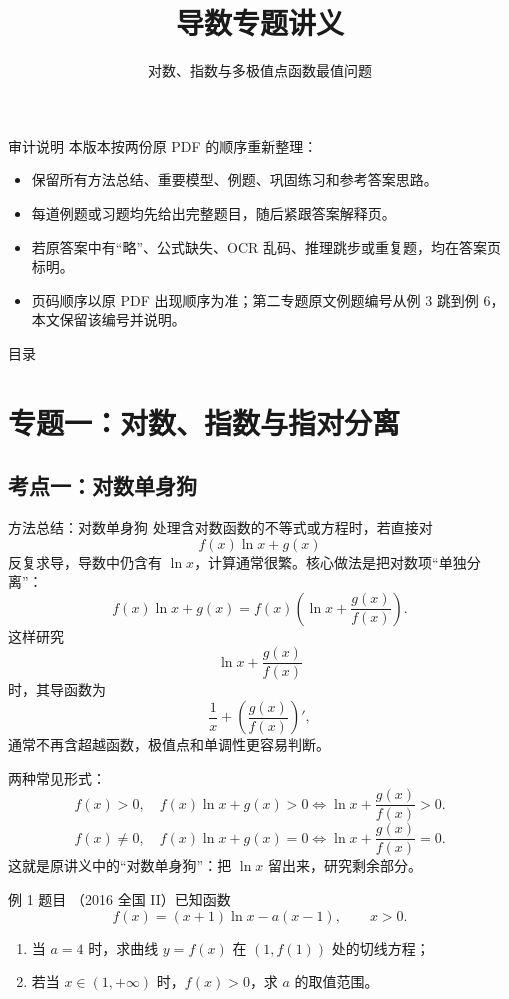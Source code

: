 ﻿\documentclass[aspectratio=169,10pt]{ctexbeamer}
\title{导数专题讲义}
\subtitle{对数、指数与多极值点函数最值问题}
\author{}
\date{}
\begin{document}
\begin{frame}
  \titlepage
\end{frame}

\begin{frame}{审计说明}
\small
本版本按两份原 PDF 的顺序重新整理：
\begin{itemize}
  \item 保留所有方法总结、重要模型、例题、巩固练习和参考答案思路。
  \item 每道例题或习题均先给出完整题目，随后紧跟答案解释页。
  \item 若原答案中有“略”、公式缺失、OCR 乱码、推理跳步或重复题，均在答案页标明。
  \item 页码顺序以原 PDF 出现顺序为准；第二专题原文例题编号从例 3 跳到例 6，本文保留该编号并说明。
\end{itemize}
\end{frame}

\begin{frame}{目录}
\tableofcontents
\end{frame}

\section{专题一：对数、指数与指对分离}

\subsection{考点一：对数单身狗}

\begin{frame}[allowframebreaks]{方法总结：对数单身狗}
\small
处理含对数函数的不等式或方程时，若直接对
\[
f(x)\ln x+g(x)
\]
反复求导，导数中仍含有 $\ln x$，计算通常很繁。核心做法是把对数项“单独分离”：
\[
f(x)\ln x+g(x)=f(x)\left(\ln x+\frac{g(x)}{f(x)}\right).
\]
这样研究
\[
\ln x+\frac{g(x)}{f(x)}
\]
时，其导函数为
\[
\frac1x+\left(\frac{g(x)}{f(x)}\right)',
\]
通常不再含超越函数，极值点和单调性更容易判断。

\framebreak

两种常见形式：
\[
f(x)>0,\quad f(x)\ln x+g(x)>0
\Longleftrightarrow
\ln x+\frac{g(x)}{f(x)}>0.
\]
\[
f(x)\ne0,\quad f(x)\ln x+g(x)=0
\Longleftrightarrow
\ln x+\frac{g(x)}{f(x)}=0.
\]
这就是原讲义中的“对数单身狗”：把 $\ln x$ 留出来，研究剩余部分。
\end{frame}

\begin{frame}{例 1 题目}
\small
（2016 全国 II）已知函数
\[
f(x)=(x+1)\ln x-a(x-1),\qquad x>0.
\]
\begin{enumerate}
  \item 当 $a=4$ 时，求曲线 $y=f(x)$ 在 $(1,f(1))$ 处的切线方程；
  \item 若当 $x\in(1,+\infty)$ 时，$f(x)>0$，求 $a$ 的取值范围。
\end{enumerate}
\end{frame}
\end{document}
